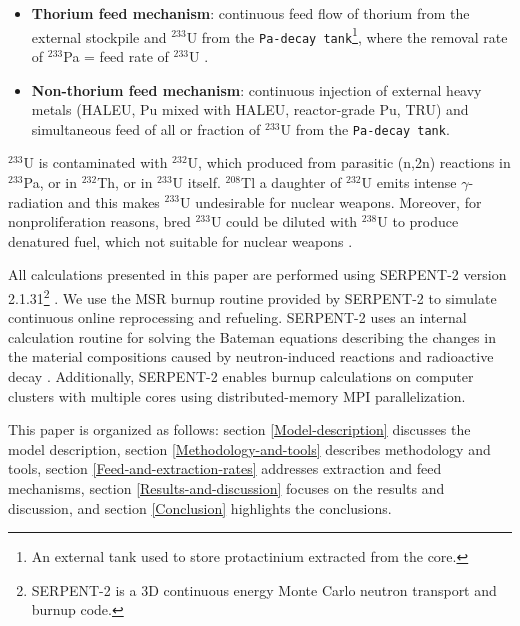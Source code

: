 \begin{itemize}
	\item \textbf{Thorium feed mechanism}: continuous feed flow of thorium from the external stockpile and $^{233}$U from the \texttt{Pa-decay tank}\footnote{An external tank used to store protactinium extracted from the core.}, where the removal rate of $^{233}$Pa = feed rate of $^{233}$U \cite{betzler2016modeling}.
	\item \textbf{Non-thorium feed mechanism}: continuous injection of external heavy metals (\gls{HALEU}, Pu mixed with \gls{HALEU}, reactor-grade Pu, \gls{TRU}) and simultaneous feed of all or fraction of $^{233}$U from the \texttt{Pa-decay tank}.
\end{itemize}

$^{233}$U is contaminated with $^{232}$U, which produced from parasitic (n,2n) reactions in $^{233}$Pa, or in $^{232}$Th, or in $^{233}$U itself. $^{208}$Tl a daughter of $^{232}$U emits intense $\gamma$-radiation and this makes $^{233}$U undesirable for nuclear weapons. Moreover, for nonproliferation reasons, bred $^{233}$U could be diluted with $^{238}$U to produce denatured fuel, which not suitable for nuclear weapons \cite{dolan2017molten}.

All calculations presented in this paper are performed using SERPENT-2 version 2.1.31\footnote{SERPENT-2 is a 3D continuous energy Monte Carlo neutron 
	transport and burnup code.} \cite{leppanen2014serpent}. We use the MSR burnup routine provided by SERPENT-2 to simulate continuous online reprocessing and refueling. SERPENT-2 uses an internal calculation routine for solving the Bateman equations describing the changes in the material compositions caused by neutron-induced reactions and radioactive decay \cite{leppanen2014serpent}. Additionally, SERPENT-2 enables burnup calculations on computer clusters with multiple cores using distributed-memory MPI parallelization.

This paper is organized as follows: section \ref{Model-description} discusses the model description, section \ref{Methodology-and-tools} describes methodology and tools, section \ref{Feed-and-extraction-rates} addresses extraction and feed mechanisms, section \ref{Results-and-discussion} focuses on the results and discussion, and section \ref{Conclusion} highlights the conclusions.